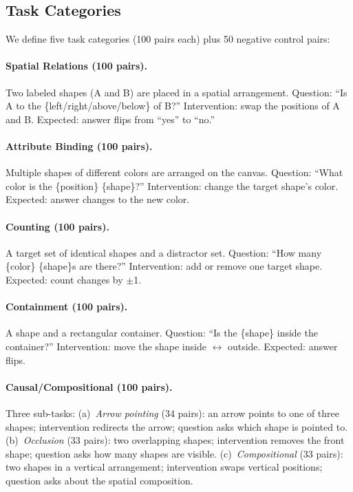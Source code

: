 \documentclass[10pt,twocolumn,letterpaper]{article}
\begin{document}
\subsection{Task Categories}

We define five task categories (100 pairs each) plus 50 negative control pairs:

\paragraph{Spatial Relations (100 pairs).} Two labeled shapes (A and B) are placed in a spatial arrangement. Question: ``Is A to the \{left/right/above/below\} of B?'' Intervention: swap the positions of A and B. Expected: answer flips from ``yes'' to ``no.''

\paragraph{Attribute Binding (100 pairs).} Multiple shapes of different colors are arranged on the canvas. Question: ``What color is the \{position\} \{shape\}?'' Intervention: change the target shape's color. Expected: answer changes to the new color.

\paragraph{Counting (100 pairs).} A target set of identical shapes and a distractor set. Question: ``How many \{color\} \{shape\}s are there?'' Intervention: add or remove one target shape. Expected: count changes by $\pm$1.

\paragraph{Containment (100 pairs).} A shape and a rectangular container. Question: ``Is the \{shape\} inside the container?'' Intervention: move the shape inside $\leftrightarrow$ outside. Expected: answer flips.

\paragraph{Causal/Compositional (100 pairs).} Three sub-tasks: (a)~\emph{Arrow pointing} (34 pairs): an arrow points to one of three shapes; intervention redirects the arrow; question asks which shape is pointed to. (b)~\emph{Occlusion} (33 pairs): two overlapping shapes; intervention removes the front shape; question asks how many shapes are visible. (c)~\emph{Compositional} (33 pairs): two shapes in a vertical arrangement; intervention swaps vertical positions; question asks about the spatial composition.
\end{document}
